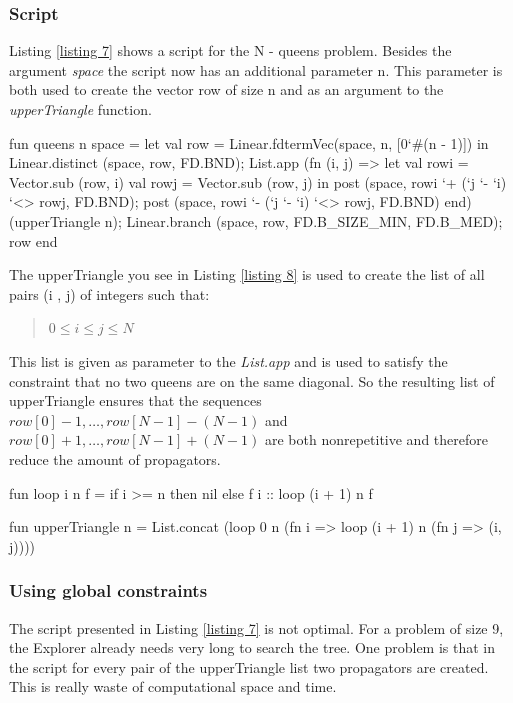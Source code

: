 \documentclass[a4paper]{scrartcl}
\begin{document}
\subsubsection{Script}
Listing \ref{listing 7} shows a script for the N - queens problem.
Besides the argument {\it space} the script now has an additional
parameter n. This parameter is both used to create the vector row of
size n and as an argument to the {\it upperTriangle} function.\\
\begin{myverbatim}
fun queens n space =
   let
      val row = Linear.fdtermVec(space, n, [0`#(n - 1)])
   in
      Linear.distinct (space, row, FD.BND);
      List.app (fn (i, j) =>
         let
            val rowi = Vector.sub (row, i)
            val rowj = Vector.sub (row, j)
         in
            post (space, rowi `+ (`j `- `i) `<> rowj, FD.BND);
            post (space, rowi `- (`j `- `i) `<> rowj, FD.BND)
         end) (upperTriangle n);
      Linear.branch (space, row, FD.B_SIZE_MIN, FD.B_MED);
      row
   end
\end{myverbatim}

\par

The  upperTriangle you see in Listing \ref{listing 8} is used
to create the list of all pairs (i , j) of integers such that:
\begin{quote}
$ 0 \leq i \le j \le N $
\end{quote}  
This list is given as parameter to the {\it List.app}  and
is used to satisfy the constraint that no two queens are on the
same diagonal. So the resulting list of upperTriangle ensures
that the sequences $ row[ 0 ] - 1, \ldots, row[ N - 1 ] - (N - 1)  $ and
$ row[ 0 ] + 1, \ldots, row[ N - 1] + (N - 1) $ are both
nonrepetitive and therefore reduce the amount of propagators.
\begin{myverbatim}
fun loop i n f = if i >= n then nil else f i :: loop (i + 1) n f

fun upperTriangle n =
   List.concat (loop 0 n 
               (fn i => loop (i + 1) n (fn j => (i, j))))

\end{myverbatim}

\subsubsection{Using global constraints}
The script presented in Listing \ref{listing 7} is not optimal.
For a problem of size 9, the Explorer already needs very long to
search the tree. One problem is that in the script for every
pair of the upperTriangle list two propagators are created. This
is really waste of computational space and time.\\
\end{document}
